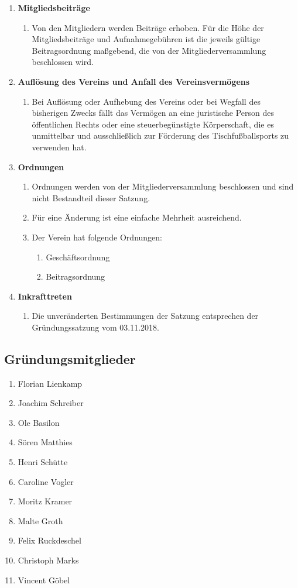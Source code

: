 \documentclass{article}
\begin{document}
\begin{enumerate}[§ 1.]
\item \textsf{\textbf{Mitgliedsbeiträge}}
\begin{enumerate}
\item Von den Mitgliedern werden Beiträge erhoben. Für die Höhe der Mitgliedsbeiträge und Aufnahmegebühren ist die jeweils gültige Beitragsordnung maßgebend, die von der Mitgliederversammlung beschlossen wird.
\end{enumerate}

\item \textsf{\textbf{Auflösung des Vereins und Anfall des Vereinsvermögens}}
\begin{enumerate}
\item Bei Auflösung oder Aufhebung des Vereins oder bei Wegfall des bisherigen Zwecks fällt das Vermögen an eine juristische Person des öffentlichen Rechts oder eine steuerbegünstigte Körperschaft, die es unmittelbar und ausschließlich zur Förderung des Tischfußballsports zu verwenden hat.
\end{enumerate}

\item \textsf{\textbf{Ordnungen}}
\begin{enumerate}
\item Ordnungen werden von der Mitgliederversammlung beschlossen und sind nicht Bestandteil dieser Satzung.
\item Für eine Änderung ist eine einfache Mehrheit ausreichend.
\item Der Verein hat folgende Ordnungen:
\begin{enumerate}
\item Geschäftsordnung
\item Beitragsordnung
\end{enumerate}
\end{enumerate}

\item \textsf{\textbf{Inkrafttreten}}
\begin{enumerate}
\item Die unveränderten Bestimmungen der Satzung entsprechen der Gründungssatzung vom 03.11.2018.
\end{enumerate}

\end{enumerate}



\subsection*{Gründungsmitglieder}
\begin{enumerate}
\item Florian Lienkamp
\item Joachim Schreiber
\item Ole Basilon
\item Sören Matthies
\item Henri Schütte
\item Caroline Vogler
\item Moritz Kramer
\item Malte Groth
\item Felix Ruckdeschel
\item Christoph Marks
\item Vincent Göbel
\end{enumerate}
\end{document}
